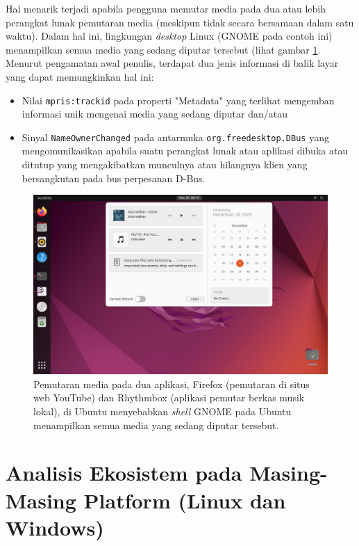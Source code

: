 Hal menarik terjadi apabila pengguna memutar media pada dua atau lebih perangkat lunak pemutaran media (meskipun tidak secara bersamaan dalam satu waktu). Dalam hal ini, lingkungan \textit{desktop} Linux (GNOME pada contoh ini) menampilkan semua media yang sedang diputar tersebut (lihat gambar \ref{ubuntu-multiple-media-playbacks}. Menurut pengamatan awal penulis, terdapat dua jenis informasi di balik layar yang dapat memungkinkan hal ini:
\begin{itemize}
    \item Nilai \verb|mpris:trackid| pada properti "Metadata" yang terlihat mengemban informasi unik mengenai media yang sedang diputar dan/atau
    \item Sinyal \verb|NameOwnerChanged| pada antarmuka \verb|org.freedesktop.DBus| yang mengomunikasikan apabila suatu perangkat lunak atau aplikasi dibuka atau ditutup yang mengakibatkan munculnya atau hilangnya klien yang bersangkutan pada bus perpesanan D-Bus.
\end{itemize}

\begin{figure}
    \centering
    \includegraphics[width=1\linewidth]{archives//contents-template-pak-prapto//chapter-4/Screenshot from 2023-12-20 00-19-07.png}
    \caption{Pemutaran media pada dua aplikasi, Firefox (pemutaran di situs web YouTube) dan Rhythmbox (aplikasi pemutar berkas musik lokal), di Ubuntu menyebabkan \textit{shell} GNOME pada Ubuntu menampilkan semua media yang sedang diputar tersebut.}
    \label{ubuntu-multiple-media-playbacks}
\end{figure}

\section{Analisis Ekosistem pada Masing-Masing Platform (Linux dan Windows)}

